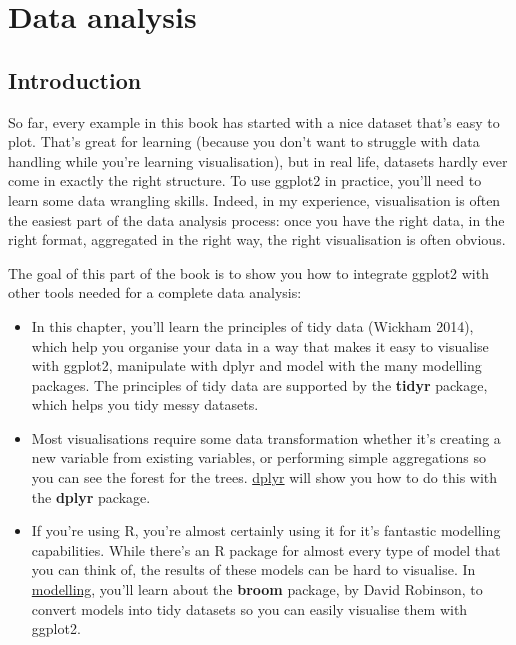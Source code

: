 \chapter{Data analysis}\label{cha:data}

\section{Introduction}

So far, every example in this book has started with a nice dataset
that's easy to plot. That's great for learning (because you don't want
to struggle with data handling while you're learning visualisation), but
in real life, datasets hardly ever come in exactly the right structure.
To use ggplot2 in practice, you'll need to learn some data wrangling
skills. Indeed, in my experience, visualisation is often the easiest
part of the data analysis process: once you have the right data, in the
right format, aggregated in the right way, the right visualisation is
often obvious.

The goal of this part of the book is to show you how to integrate
ggplot2 with other tools needed for a complete data analysis:

\begin{itemize}
\item
  In this chapter, you'll learn the principles of tidy data (Wickham
  2014), which help you organise your data in a way that makes it easy
  to visualise with ggplot2, manipulate with dplyr and model with the
  many modelling packages. The principles of tidy data are supported by
  the \textbf{tidyr} package, which helps you tidy messy datasets.
\item
  Most visualisations require some data transformation whether it's
  creating a new variable from existing variables, or performing simple
  aggregations so you can see the forest for the trees.
  \hyperref[cha:dplyr]{dplyr} will show you how to do this with the
  \textbf{dplyr} package.
\item
  If you're using R, you're almost certainly using it for it's fantastic
  modelling capabilities. While there's an R package for almost every
  type of model that you can think of, the results of these models can
  be hard to visualise. In \hyperref[cha:modelling]{modelling}, you'll
  learn about the \textbf{broom} package, by David Robinson, to convert
  models into tidy datasets so you can easily visualise them with
  ggplot2.
\end{itemize}

